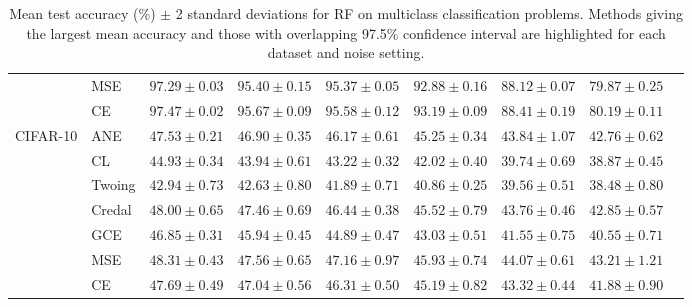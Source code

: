 \documentclass[letterpaper]{article} %
\begin{document}
\begin{table}[t]
\begin{tabular}{clccccccc}
 & MSE    & $97.29 \pm 0.03$ & $95.40 \pm 0.15$ & $95.37 \pm 0.05$ & $92.88 \pm 0.16$ & $88.12 \pm 0.07$ & $79.87 \pm 0.25$ \\
 & CE     & $\mathbf{97.47 \pm 0.02}$ & $95.67 \pm 0.09$ & $\mathbf{95.58 \pm 0.12}$ & $93.19 \pm 0.09$ & $88.41 \pm 0.19$ & $80.19 \pm 0.11$ \\
\hline
\multirow{7}{*}{CIFAR-10}
 & ANE    & $47.53 \pm 0.21$ & $\mathbf{46.90 \pm 0.35}$ & $\mathbf{46.17 \pm 0.61}$ & $\mathbf{45.25 \pm 0.34}$ & $\mathbf{43.84 \pm 1.07}$ & $\mathbf{42.76 \pm 0.62}$ \\
 & CL     & $44.93 \pm 0.34$ & $43.94 \pm 0.61$ & $43.22 \pm 0.32$ & $42.02 \pm 0.40$ & $39.74 \pm 0.69$ & $38.87 \pm 0.45$ \\
 & Twoing & $42.94 \pm 0.73$ & $42.63 \pm 0.80$ & $41.89 \pm 0.71$ & $40.86 \pm 0.25$ & $39.56 \pm 0.51$ & $38.48 \pm 0.80$ \\
 & Credal & $\mathbf{48.00 \pm 0.65}$ & $\mathbf{47.46 \pm 0.69}$ & $\mathbf{46.44 \pm 0.38}$ & $\mathbf{45.52 \pm 0.79}$ & $\mathbf{43.76 \pm 0.46}$ & $\mathbf{42.85 \pm 0.57}$ \\
 & GCE    & $46.85 \pm 0.31$ & $45.94 \pm 0.45$ & $44.89 \pm 0.47$ & $43.03 \pm 0.51$ & $41.55 \pm 0.75$ & $40.55 \pm 0.71$ \\
 & MSE    & $\mathbf{48.31 \pm 0.43}$ & $\mathbf{47.56 \pm 0.65}$ & $\mathbf{47.16 \pm 0.97}$ & $\mathbf{45.93 \pm 0.74}$ & $\mathbf{44.07 \pm 0.61}$ & $\mathbf{43.21 \pm 1.21}$ \\
 & CE     & $\mathbf{47.69 \pm 0.49}$ & $\mathbf{47.04 \pm 0.56}$ & $\mathbf{46.31 \pm 0.50}$ & $\mathbf{45.19 \pm 0.82}$ & $\mathbf{43.32 \pm 0.44}$ & $\mathbf{41.88 \pm 0.90}$ \\
\hline
\end{tabular}
\caption{Mean test accuracy (\%) $\pm$ 2 standard deviations for RF on multiclass classification problems. Methods giving the largest mean accuracy and those with overlapping 97.5\% confidence interval are highlighted for each dataset and noise setting.}
\label{tab:rf-mc}
\end{table}



\end{document}
